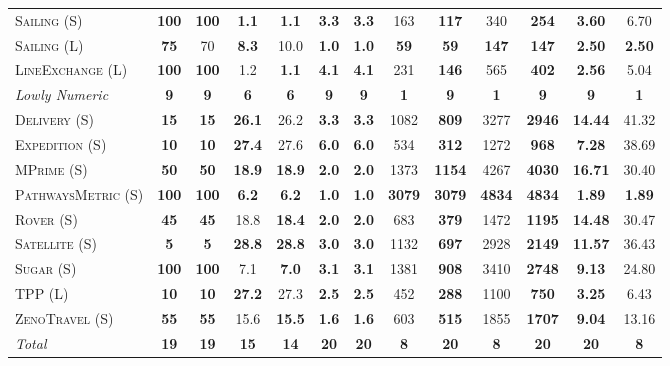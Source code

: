 \documentclass[11pt]{article}
\begin{document}
\begin{table}[tb]
{\begin{tabular}{|l||cc||cc||cc||cc||cc||cc||}
\textsc{Sailing} (S)&\textbf{100}&\textbf{100}&\textbf{1.1}&\textbf{1.1}&\textbf{3.3}&\textbf{3.3}&163&\textbf{117}&340&\textbf{254}&\textbf{3.60}&6.70\\
\textsc{Sailing} (L)&\textbf{75}&70&\textbf{8.3}&10.0&\textbf{1.0}&\textbf{1.0}&\textbf{59}&\textbf{59}&\textbf{147}&\textbf{147}&\textbf{2.50}&\textbf{2.50}\\
\textsc{LineExchange} (L)&\textbf{100}&\textbf{100}&1.2&\textbf{1.1}&\textbf{4.1}&\textbf{4.1}&231&\textbf{146}&565&\textbf{402}&\textbf{2.56}&5.04
\\\hline
\textit{Lowly Numeric}&\textbf{9}&\textbf{9}&\textbf{6}&\textbf{6}&\textbf{9}&\textbf{9}&\textbf{1}&\textbf{9}&\textbf{1}&\textbf{9}&\textbf{9}&\textbf{1}\\\hline
\textsc{Delivery} (S)&\textbf{15}&\textbf{15}&\textbf{26.1}&26.2&\textbf{3.3}&\textbf{3.3}&1082&\textbf{809}&3277&\textbf{2946}&\textbf{14.44}&41.32\\
\textsc{Expedition} (S)&\textbf{10}&\textbf{10}&\textbf{27.4}&27.6&\textbf{6.0}&\textbf{6.0}&534&\textbf{312}&1272&\textbf{968}&\textbf{7.28}&38.69\\
\textsc{MPrime} (S)&\textbf{50}&\textbf{50}&\textbf{18.9}&\textbf{18.9}&\textbf{2.0}&\textbf{2.0}&1373&\textbf{1154}&4267&\textbf{4030}&\textbf{16.71}&30.40\\
\textsc{PathwaysMetric} (S)&\textbf{100}&\textbf{100}&\textbf{6.2}&\textbf{6.2}&\textbf{1.0}&\textbf{1.0}&\textbf{3079}&\textbf{3079}&\textbf{4834}&\textbf{4834}&\textbf{1.89}&\textbf{1.89}\\
\textsc{Rover} (S)&\textbf{45}&\textbf{45}&18.8&\textbf{18.4}&\textbf{2.0}&\textbf{2.0}&683&\textbf{379}&1472&\textbf{1195}&\textbf{14.48}&30.47\\
\textsc{Satellite} (S)&\textbf{5}&\textbf{5}&\textbf{28.8}&\textbf{28.8}&\textbf{3.0}&\textbf{3.0}&1132&\textbf{697}&2928&\textbf{2149}&\textbf{11.57}&36.43\\
\textsc{Sugar} (S)&\textbf{100}&\textbf{100}&7.1&\textbf{7.0}&\textbf{3.1}&\textbf{3.1}&1381&\textbf{908}&3410&\textbf{2748}&\textbf{9.13}&24.80\\
\textsc{TPP} (L)&\textbf{10}&\textbf{10}&\textbf{27.2}&27.3&\textbf{2.5}&\textbf{2.5}&452&\textbf{288}&1100&\textbf{750}&\textbf{3.25}&6.43\\
\textsc{ZenoTravel} (S)&\textbf{55}&\textbf{55}&15.6&\textbf{15.5}&\textbf{1.6}&\textbf{1.6}&603&\textbf{515}&1855&\textbf{1707}&\textbf{9.04}&13.16
\\\hline
\textit{Total}&\textbf{19}&\textbf{19}&\textbf{15}&\textbf{14}&\textbf{20}&\textbf{20}&\textbf{8}&\textbf{20}&\textbf{8}&\textbf{20}&\textbf{20}&\textbf{8}\\\hline


\end{tabular}}
\end{table}
\end{document}
